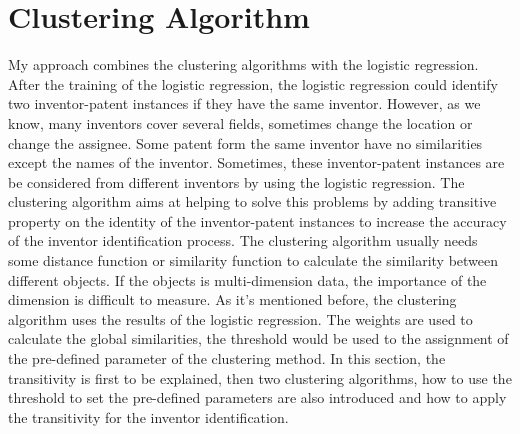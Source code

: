\section{Clustering Algorithm}
My approach combines the clustering algorithms with the logistic regression. After the training of the logistic regression, the logistic regression could identify two inventor-patent instances if they have the same inventor. However, as we know, many inventors cover several fields, sometimes change the location or change the assignee. Some patent form the same inventor have no similarities except the names of the inventor. Sometimes, these inventor-patent instances are be considered from different inventors by using the logistic regression. The clustering algorithm aims at helping to solve this problems by adding transitive property on the identity of the inventor-patent instances to increase the accuracy of the inventor identification process. The clustering algorithm usually needs some distance function or similarity function to calculate the similarity between different objects. If the objects is multi-dimension data, the importance of the dimension is difficult to measure. As it's mentioned before, the clustering algorithm uses the results of the logistic regression. The weights are used to calculate the global similarities, the threshold would be used to the assignment of the pre-defined parameter of the clustering method. In this section, the transitivity is first to be explained, then two clustering algorithms, how to use the threshold to set the pre-defined parameters are also introduced and how to apply the transitivity for the inventor identification.

